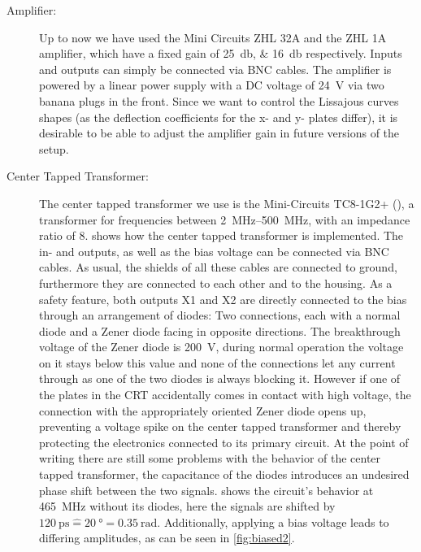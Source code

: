 \begin{description}
	\item[Amplifier:] Up to now we have used the Mini Circuits ZHL 32A \cite{MiniCircuits2021a}  and the ZHL 1A \cite{MiniCircuits2021} amplifier, which have a fixed gain of \SIlist{25; 16}{\decibel} respectively. Inputs and outputs can simply be connected via BNC cables. The amplifier is powered by a linear power supply with a DC voltage of \SI{24}{\volt} via two banana plugs in the front. Since we want to control the Lissajous curves shapes (as the deflection coefficients for the x- and y- plates differ), it is desirable to be able to adjust the amplifier gain in future versions of the setup. 
	
	\item[Center Tapped Transformer:] The center tapped transformer we use is the Mini-Circuits TC8-1G2+ (\cite{TC8-1G2}), a transformer for frequencies between \SIrange{2}{500}{\mega\hertz}, with an impedance ratio of 8.  shows how the center tapped transformer is implemented. The in- and outputs, as well as the bias voltage can be connected via BNC cables. As usual, the shields of all these cables are connected to ground, furthermore they are connected to each other and to the housing. As a safety feature, both outputs X1 and X2 are directly connected to the bias through an arrangement of diodes: Two connections, each with a normal diode and a Zener diode facing in opposite directions. The breakthrough voltage of the Zener diode is \SI{200}{\volt}, during normal operation the voltage on it stays below this value and none of the connections let any current through as one of the two diodes is always blocking it. However if one of the plates in the CRT accidentally comes in contact with high voltage, the connection with the appropriately oriented Zener diode opens up, preventing a voltage spike on the center tapped transformer and thereby protecting the electronics connected to its primary circuit.
	At the point of writing there are still some problems with the behavior of the center tapped transformer, the capacitance of the diodes introduces an undesired phase shift between the two signals.  shows the circuit's behavior at \SI{465}{\mega\hertz} without its diodes, here the signals are shifted by $\SI{120}{\pico\second} \mathrel{\widehat{=}} \SI{20}{\degree} = \SI{0.35}{\radian}$. Additionally, applying a bias voltage leads to differing amplitudes, as can be seen in \cref{fig:biased2}.
	

\end{description}
